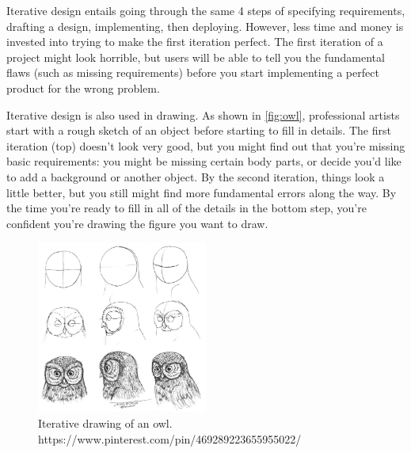 Iterative design entails going through the same 4 steps of specifying requirements, drafting a design, implementing, then deploying. However, less time and money is invested into trying to make the first iteration perfect. The first iteration of a project might look horrible, but users will be able to tell you the fundamental flaws (such as missing requirements) before you start implementing a perfect product for the wrong problem. 

Iterative design is also used in drawing. As shown in \autoref{fig:owl}, professional artists start with a rough sketch of an object before starting to fill in details. The first iteration (top) doesn't look very good, but you might find out that you're missing basic requirements: you might be missing certain body parts, or decide you'd like to add a background or another object. By the second iteration, things look a little better, but you still might find more fundamental errors along the way. By the time you're ready to fill in all of the details in the bottom step, you're confident you're drawing the figure you want to draw. 

\begin{figure}
	\centering
	\includegraphics[width=0.5\textwidth]{images/owl.jpg}
	\caption{Iterative drawing of an owl. https://www.pinterest.com/pin/469289223655955022/}
	\label{fig:owl}
\end{figure}